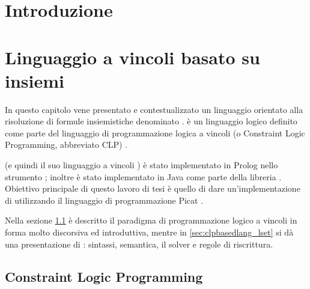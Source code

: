 \documentclass[12pt,a4paper,openright]{book} %
\newenvironment{dedication}                   %
  {%
   \thispagestyle{empty}%
   \vspace*{\stretch{1}}%
   \itshape             %
   \raggedleft          %
  }
  {\par %
   \vspace{\stretch{3}} %
   \clearpage           %
  }
\begin{document}

\tableofcontents
\listoffigures
\listofalgorithms



\chapter*{Introduzione}
\thispagestyle{empty}
\lipsum[1-4]
\thispagestyle{empty}


\chapter{Linguaggio a vincoli basato su insiemi}
\label{ch:clpbasedlang}

\minitoc

In questo capitolo vene presentato e contestualizzato un linguaggio orientato alla risoluzione di formule insiemistiche denominato \lset{}. \lset{} è un linguaggio logico definito come parte del linguaggio di programmazione logica a vincoli (o Constraint Logic Programming, abbreviato CLP) \clpset{}.

\clpset{} (e quindi il suo linguaggio a vincoli \lset{}) è stato implementato in Prolog nello strumento \setlog{} \cite{SetLog}; inoltre \lset{} è stato implementato in Java come parte della libreria \jsetl{} \cite{JSetL}. Obiettivo principale di questo lavoro di tesi è quello di dare un’implementazione di \lset{} utilizzando il linguaggio di programmazione Picat \cite{PicatLang}.

Nella sezione \ref{sec:clpbasedlang_clp} è descritto il paradigma di programmazione logico a vincoli in forma molto discorsiva ed introduttiva, mentre in \ref{sec:clpbasedlang_lset} si dà una presentazione di \lset{}: sintassi, semantica, il solver e regole di riscrittura.

\section{Constraint Logic Programming}
\label{sec:clpbasedlang_clp}
\end{document}
